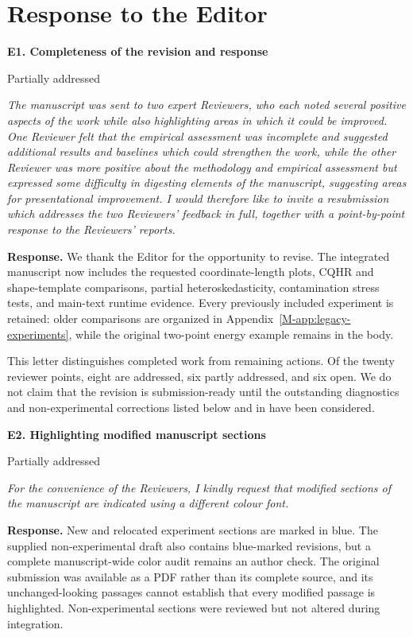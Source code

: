 \documentclass[11pt]{article}
\newcommand{\msapp}[1]{Appendix~\ref*{M-#1}}
\newcommand{\point}[3]{\par\Needspace{7\baselineskip}\medskip
\noindent\parbox[t]{0.77\linewidth}{\textbf{#1}}\hfill
\parbox[t]{0.21\linewidth}{\raggedleft\small\sffamily #2}\par\nopagebreak
{\color{ReviewerBlue}\small\itshape #3\par}\textbf{Response.} }
\begin{document}
\clearpage
\section*{Response to the Editor}

\point{E1. Completeness of the revision and response}{Partially addressed}{The manuscript was sent to two expert Reviewers, who each noted several
positive aspects of the work while also highlighting areas in which it
could be improved. One Reviewer felt that the empirical assessment was
incomplete and suggested additional results and baselines which could
strengthen the work, while the other Reviewer was more positive about the
methodology and empirical assessment but expressed some difficulty in
digesting elements of the manuscript, suggesting areas for presentational
improvement. I would therefore like to invite a resubmission which
addresses the two Reviewers' feedback in full, together with a
point-by-point response to the Reviewers' reports.}
\label{response:E1}
We thank the Editor for the opportunity to revise. The integrated manuscript now includes the requested coordinate-length plots, CQHR and shape-template comparisons, partial heteroskedasticity, contamination stress tests, and main-text runtime evidence. Every previously included experiment is retained: older comparisons are organized in \msapp{app:legacy-experiments}, while the original two-point energy example remains in the body.

This letter distinguishes completed work from remaining actions. Of the twenty reviewer points, eight are addressed, six partly addressed, and six open. We do not claim that the revision is submission-ready until the outstanding diagnostics and non-experimental corrections listed below and in  have been considered.

\point{E2. Highlighting modified manuscript sections}{Partially addressed}{For the convenience of the Reviewers, I kindly request that modified
sections of the manuscript are indicated using a different colour font.}
\label{response:E2}
New and relocated experiment sections are marked in blue. The supplied non-experimental draft also contains blue-marked revisions, but a complete manuscript-wide color audit remains an author check. The original submission was available as a PDF rather than its complete source, and its unchanged-looking passages cannot establish that every modified passage is highlighted. Non-experimental sections were reviewed but not altered during integration.
\end{document}
